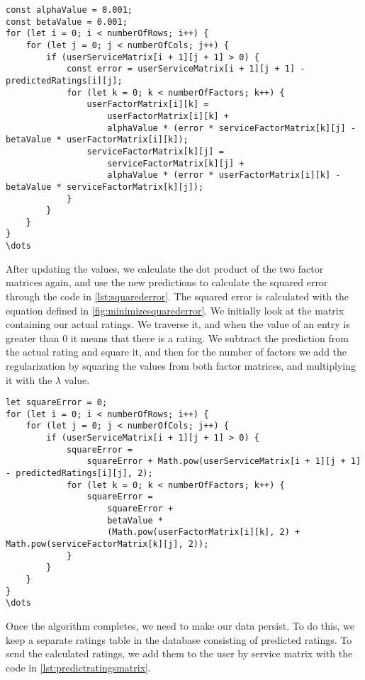 \begin{lstlisting}[caption={Calculating error and updating values}, captionpos=b, label={lst:errorandupdates}]
const alphaValue = 0.001;
const betaValue = 0.001;
for (let i = 0; i < numberOfRows; i++) {
    for (let j = 0; j < numberOfCols; j++) {
        if (userServiceMatrix[i + 1][j + 1] > 0) {
            const error = userServiceMatrix[i + 1][j + 1] - predictedRatings[i][j];
            for (let k = 0; k < numberOfFactors; k++) {
                userFactorMatrix[i][k] =
                    userFactorMatrix[i][k] +
                    alphaValue * (error * serviceFactorMatrix[k][j] - betaValue * userFactorMatrix[i][k]);
                serviceFactorMatrix[k][j] =
                    serviceFactorMatrix[k][j] +
                    alphaValue * (error * userFactorMatrix[i][k] - betaValue * serviceFactorMatrix[k][j]);
            }
        }
    }
}
\dots
\end{lstlisting}
After updating the values, we calculate the dot product of the two factor matrices again, and use the new predictions to calculate the squared error through the code in \autoref{lst:squarederror}.
The squared error is calculated with the equation defined in \autoref{fig:minimizesquarederror}.
We initially look at the matrix containing our actual ratings.
We traverse it, and when the value of an entry is greater than 0 it means that there is a rating.
We subtract the prediction from the actual rating and square it, and then for the number of factors we add the regularization by squaring the values from both factor matrices, and multiplying it with the $\lambda$ value.
\begin{lstlisting}[caption={Calculating the overall squared error}, captionpos=b, label={lst:squarederror}]
let squareError = 0;
for (let i = 0; i < numberOfRows; i++) {
    for (let j = 0; j < numberOfCols; j++) {
        if (userServiceMatrix[i + 1][j + 1] > 0) {
            squareError =
                squareError + Math.pow(userServiceMatrix[i + 1][j + 1] - predictedRatings[i][j], 2);
            for (let k = 0; k < numberOfFactors; k++) {
                squareError =
                    squareError +
                    betaValue *
                    (Math.pow(userFactorMatrix[i][k], 2) + Math.pow(serviceFactorMatrix[k][j], 2));
            }
        }
    }
}
\dots
\end{lstlisting}
Once the algorithm completes, we need to make our data persist.
To do this, we keep a separate ratings table in the database consisting of predicted ratings.
To send the calculated ratings, we add them to the user by service matrix with the code in \autoref{lst:predictratingsmatrix}.
